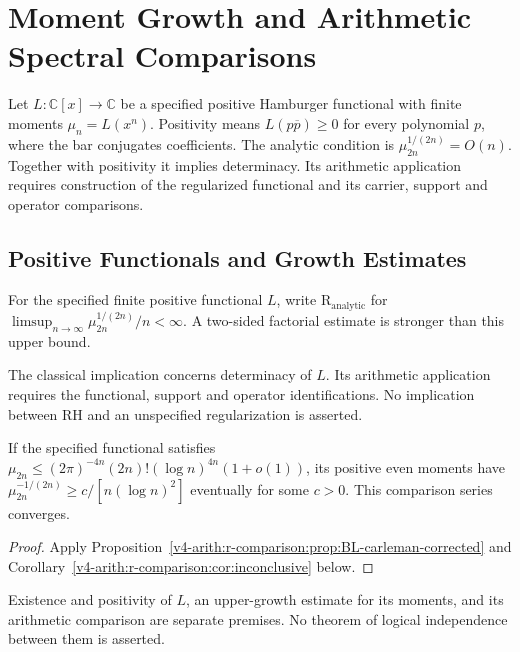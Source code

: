 \chapter{Moment Growth and Arithmetic Spectral Comparisons}
\label{v4-arith:R-analytic-comparison}
Let \(L:\mathbb C[x]\to\mathbb C\) be a specified positive Hamburger
functional with finite moments \(\mu_n=L(x^n)\). Positivity means
\(L(p\overline p)\geq0\) for every polynomial \(p\), where the bar
conjugates coefficients. The analytic condition is
\(\mu_{2n}^{1/(2n)}=O(n)\). Together with positivity it implies
determinacy. Its arithmetic application requires construction of the
regularized functional and its carrier, support and operator comparisons.

\section{Positive Functionals and Growth Estimates}
\label{v4-arith:r-comparison:statement}
\begin{definition}
\label{v4-arith:r-comparison:claim-1}
For the specified finite positive functional \(L\), write
\(\mathrm R_{\mathrm{analytic}}\) for
\(\limsup_{n\to\infty}\mu_{2n}^{1/(2n)}/n<\infty\).
A two-sided factorial estimate is stronger than this upper bound.
\end{definition}
\begin{remark}
\label{v4-arith:r-comparison:claim-2}
The classical implication concerns determinacy of \(L\). Its arithmetic
application requires the functional, support and operator identifications.
No implication between RH and an unspecified regularization is asserted.
\end{remark}
\begin{proposition}
\label{v4-arith:r-comparison:claim-3}
If the specified functional satisfies
\(\mu_{2n}\leq(2\pi)^{-4n}(2n)!(\log n)^{4n}(1+o(1))\),
its positive even moments have
\(\mu_{2n}^{-1/(2n)}\geq c/[n(\log n)^2]\) eventually for some
\(c>0\). This comparison series converges.
\end{proposition}
\begin{proof}
Apply Proposition~\ref{v4-arith:r-comparison:prop:BL-carleman-corrected} and
Corollary~\ref{v4-arith:r-comparison:cor:inconclusive} below.
\end{proof}
\begin{remark}
\label{v4-arith:r-comparison:claim-paraphrase}
Existence and positivity of \(L\), an upper-growth estimate for its
moments, and its arithmetic comparison are separate premises.
No theorem of logical independence between them is asserted.
\end{remark}

